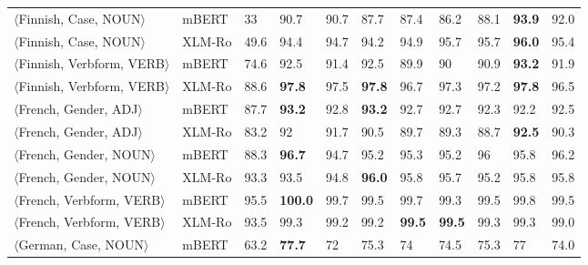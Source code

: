 \begin{tabular}{llllllllllr}
     $\langle$Finnish, Case, NOUN$\rangle$ &          mBERT &             33 &          90.7 &           90.7 &         87.7 &         87.4 &         86.2 &         88.1 &    \textbf{93.9} &           92.0 \\
     $\langle$Finnish, Case, NOUN$\rangle$ &         XLM-Ro &           49.6 &          94.4 &           94.7 &         94.2 &         94.9 &         95.7 &         95.7 &    \textbf{96.0} &           95.4 \\
 $\langle$Finnish, Verbform, VERB$\rangle$ &          mBERT &           74.6 &          92.5 &           91.4 &         92.5 &         89.9 &           90 &         90.9 &    \textbf{93.2} &           91.9 \\
 $\langle$Finnish, Verbform, VERB$\rangle$ &         XLM-Ro &           88.6 &    \textbf{97.8} &           97.5 &   \textbf{97.8} &         96.7 &         97.3 &         97.2 &    \textbf{97.8} &           96.5 \\
     $\langle$French, Gender, ADJ$\rangle$ &          mBERT &           87.7 &    \textbf{93.2} &           92.8 &   \textbf{93.2} &         92.7 &         92.7 &         92.3 &          92.2 &           92.5 \\
     $\langle$French, Gender, ADJ$\rangle$ &         XLM-Ro &           83.2 &            92 &           91.7 &         90.5 &         89.7 &         89.3 &         88.7 &    \textbf{92.5} &           90.3 \\
    $\langle$French, Gender, NOUN$\rangle$ &          mBERT &           88.3 &    \textbf{96.7} &           94.7 &         95.2 &         95.3 &         95.2 &           96 &          95.8 &           96.2 \\
    $\langle$French, Gender, NOUN$\rangle$ &         XLM-Ro &           93.3 &          93.5 &           94.8 &   \textbf{96.0} &         95.8 &         95.7 &         95.2 &          95.8 &           95.8 \\
  $\langle$French, Verbform, VERB$\rangle$ &          mBERT &           95.5 &   \textbf{100.0} &           99.7 &         99.5 &         99.7 &         99.3 &         99.5 &          99.8 &           99.5 \\
  $\langle$French, Verbform, VERB$\rangle$ &         XLM-Ro &           93.5 &          99.3 &           99.2 &         99.2 &   \textbf{99.5} &   \textbf{99.5} &         99.3 &          99.3 &           99.0 \\
      $\langle$German, Case, NOUN$\rangle$ &          mBERT &           63.2 &    \textbf{77.7} &             72 &         75.3 &           74 &         74.5 &         75.3 &            77 &           74.0 \\

\end{tabular}
